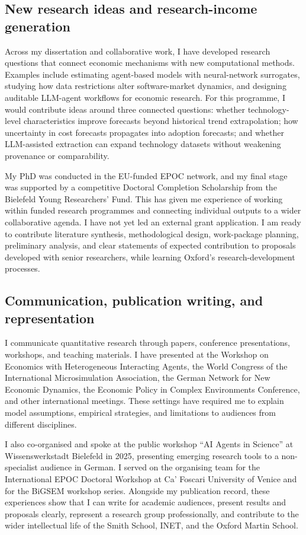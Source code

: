 \documentclass{nfr}
\begin{document}
\subsection*{New research ideas and research-income generation}

Across my dissertation and collaborative work, I have developed research questions that connect economic mechanisms with new computational methods. Examples include estimating agent-based models with neural-network surrogates, studying how data restrictions alter software-market dynamics, and designing auditable LLM-agent workflows for economic research. For this programme, I would contribute ideas around three connected questions: whether technology-level characteristics improve forecasts beyond historical trend extrapolation; how uncertainty in cost forecasts propagates into adoption forecasts; and whether LLM-assisted extraction can expand technology datasets without weakening provenance or comparability.

My PhD was conducted in the EU-funded EPOC network, and my final stage was supported by a competitive Doctoral Completion Scholarship from the Bielefeld Young Researchers' Fund. This has given me experience of working within funded research programmes and connecting individual outputs to a wider collaborative agenda. I have not yet led an external grant application. I am ready to contribute literature synthesis, methodological design, work-package planning, preliminary analysis, and clear statements of expected contribution to proposals developed with senior researchers, while learning Oxford's research-development processes.

\subsection*{Communication, publication writing, and representation}

I communicate quantitative research through papers, conference presentations, workshops, and teaching materials. I have presented at the Workshop on Economics with Heterogeneous Interacting Agents, the World Congress of the International Microsimulation Association, the German Network for New Economic Dynamics, the Economic Policy in Complex Environments Conference, and other international meetings. These settings have required me to explain model assumptions, empirical strategies, and limitations to audiences from different disciplines.

I also co-organised and spoke at the public workshop ``AI Agents in Science'' at Wissenswerkstadt Bielefeld in 2025, presenting emerging research tools to a non-specialist audience in German. I served on the organising team for the International EPOC Doctoral Workshop at Ca' Foscari University of Venice and for the BiGSEM workshop series. Alongside my publication record, these experiences show that I can write for academic audiences, present results and proposals clearly, represent a research group professionally, and contribute to the wider intellectual life of the Smith School, INET, and the Oxford Martin School.
\end{document}
